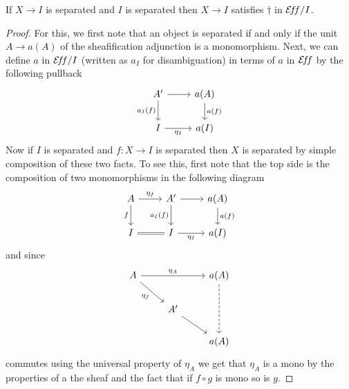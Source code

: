 \begin{lem}\label{defn:orth:sepsliceimpliesdagger}
  If $X \to I$ is separated and $I$ is separated then $X \to I$
  satisfies $\dagger$ in $\mathcal{E}\!f\!f/I$.
\end{lem}
\begin{proof}
  For this, we first note that an object is separated if and only if
  the unit $A \to a(A)$ of the sheafification adjunction is a
  monomorphism. Next, we can define $a$ in $\mathcal{E}\!f\!f/I$ (written as $a_I$
  for disambiguation) in terms of $a$ in $\mathcal{E}\!f\!f$ by the following
  pullback
  \[
    \begin{tikzcd}
      A' \ar[r] \ar[d, swap, "a_I(f)"] & a(A) \ar[d, "a(f)"]\\
      I \ar[r, swap, "\eta_I"] & a(I)
    \end{tikzcd}
  \]
  Now if $I$ is separated and $f : X \to I$ is separated then $X$ is
  separated by simple composition of these two facts. To see this,
  first note that the top side is the composition of two monomorphisms
  in the following diagram
  \[
    \begin{tikzcd}
      A \ar[d, swap, "f"] \ar[r, "\eta_f"] & A' \ar[r] \ar[d, swap, "a_I(f)"] & a(A) \ar[d, "a(f)"]\\
      I \ar[r, equals] & I \ar[r, swap, "\eta_I"] & a(I)
    \end{tikzcd}
  \]
  and since
  \[
    \begin{tikzcd}
      A \ar[rd, swap, "\eta_f"] \ar[rr, "\eta_A"]&& a(A) \ar[dd, dashed]\\
      &A' \ar[dr]&\\
      && a(A)
    \end{tikzcd}
  \]
  commutes using the universal property of $\eta_A$ we get that
  $\eta_A$ is a mono by the properties of a the sheaf and the fact
  that if $f \circ g$ is mono so is $g$.


\end{proof}
